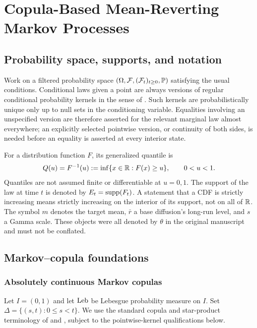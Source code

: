 \section{Copula-Based Mean-Reverting Markov Processes}
\label{sec:copula-foundations}

\subsection{Probability space, supports, and notation}

Work on a filtered probability space
$(\Omega,\mathcal F,(\mathcal F_t)_{t\ge0},\mathbb P)$ satisfying the usual
conditions.  Conditional laws given a point are always versions of regular
conditional probability kernels in the sense of
\citet[Chapter~8]{Kallenberg2021}.  Such kernels are probabilistically unique
only up to null sets in the conditioning variable.  Equalities involving an
unspecified version are therefore asserted for the relevant marginal law almost
everywhere; an explicitly selected pointwise version, or continuity of both
sides, is needed before an equality is asserted at every interior state.

For a distribution function $F$, its generalized quantile is
\begin{equation}
Q(u)=F^{-1}(u):=\inf\{x\in\mathbb R:F(x)\ge u\},\qquad 0<u<1.
\label{rev:quantile}
\end{equation}
Quantiles are not assumed finite or differentiable at $u=0,1$.  The support of
the law at time $t$ is denoted by $E_t=\operatorname{supp}(F_t)$.  A statement that a CDF is
strictly increasing means strictly increasing on the interior of its support,
not on all of $\mathbb R$.  The symbol $m$ denotes the target mean, $\bar r$ a base
diffusion's long-run level, and $s$ a Gamma scale.  These objects were all denoted
by $\theta$ in the original manuscript and must not be conflated.

\subsection{Markov--copula foundations}

\subsubsection{Absolutely continuous Markov copulas}

Let $I=(0,1)$ and let $\operatorname{Leb}$ be Lebesgue probability measure on $I$.
Set $\Delta=\{(s,t):0\le s<t\}$.
We use the standard copula and star-product terminology of
\citet{Nelsen2006} and \citet{DarsowNguyenOlsen1992}, subject to the
pointwise-kernel qualifications below.

